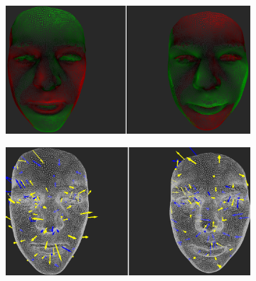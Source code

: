 \begin{figure}[h]
\centering
\begin{subfigure}{0.49\textwidth}
\includegraphics[width=\textwidth]{./img-study/pair12.PNG}
\caption{}
\label{fig:study-4-12}
\end{subfigure}
\begin{subfigure}{0.49\textwidth}
\includegraphics[width=\textwidth]{./img-study/pair14.PNG}
\caption{}
\label{fig:study-4-14}
\end{subfigure}


\end{figure}
